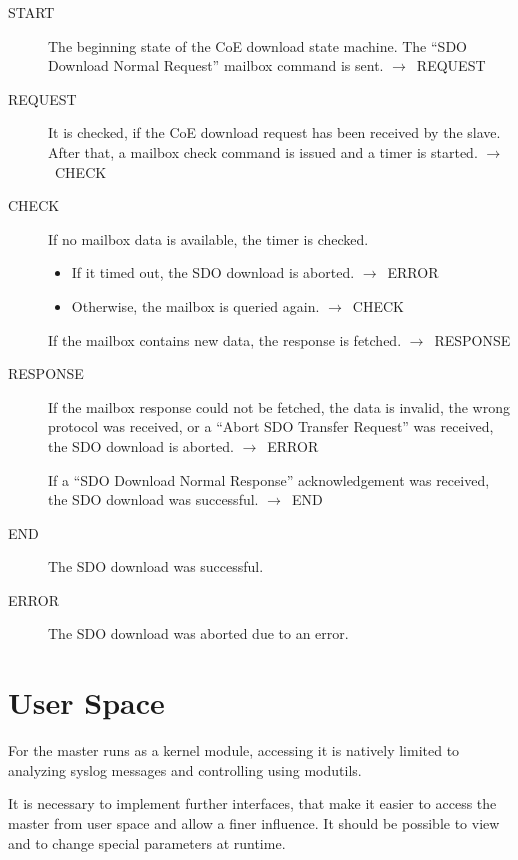 \documentclass[a4paper,12pt,BCOR6mm,bibtotoc,idxtotoc]{scrbook}
\begin{document}
\begin{description}
\item[START] The beginning state of the CoE download state
  machine. The ``SDO Download Normal Request'' mailbox command is
  sent. $\rightarrow$~REQUEST

\item[REQUEST] It is checked, if the CoE download request has been
  received by the slave. After that, a mailbox check command is issued
  and a timer is started. $\rightarrow$~CHECK

\item[CHECK] If no mailbox data is available, the timer is checked.
  \begin{itemize}
  \item If it timed out, the SDO download is aborted.
    $\rightarrow$~ERROR
  \item Otherwise, the mailbox is queried again.
    $\rightarrow$~CHECK
  \end{itemize}

  If the mailbox contains new data, the response is fetched.
  $\rightarrow$~RESPONSE

\item[RESPONSE] If the mailbox response could not be fetched, the data
  is invalid, the wrong protocol was received, or a ``Abort SDO
  Transfer Request'' was received, the SDO download is aborted.
  $\rightarrow$~ERROR

  If a ``SDO Download Normal Response'' acknowledgement was received,
  the SDO download was successful. $\rightarrow$~END

\item[END] The SDO download was successful.

\item[ERROR] The SDO download was aborted due to an error.

\end{description}


\section{User Space}
\label{sec:user}

For the master runs as a kernel module, accessing it is natively
limited to analyzing syslog messages and controlling using modutils.

It is necessary to implement further interfaces, that make it easier
to access the master from user space and allow a finer influence. It
should be possible to view and to change special parameters at runtime.
\end{document}
